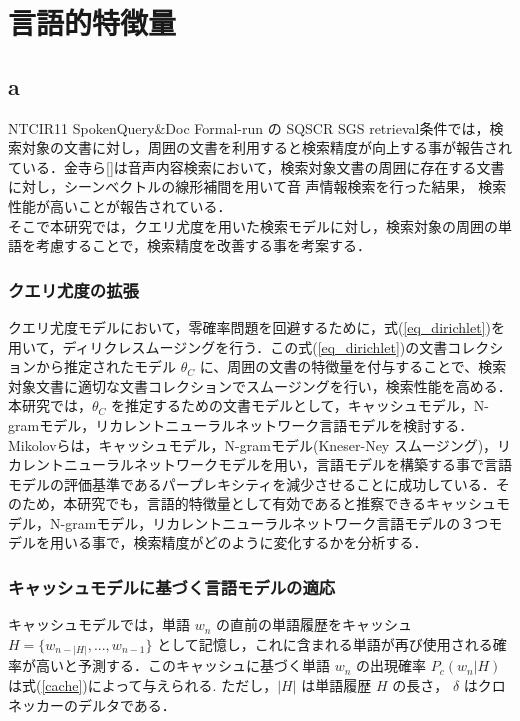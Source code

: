 \chapter{言語的特徴量}

\section{a}


NTCIR11 SpokenQuery\&Doc Formal-run の SQSCR SGS retrieval条件では，検索対象の文書に対し，周囲の文書を利用すると検索精度が向上する事が報告されている．金寺ら[]は音声内容検索において，検索対象文書の周囲に存在する文書に対し，シーンべクトルの線形補間を用いて音
声情報検索を行った結果，
検索性能が高いことが報告されている． \\
そこで本研究では，クエリ尤度を用いた検索モデルに対し，検索対象の周囲の単語を考慮することで，検索精度を改善する事を考案する．

\subsection{クエリ尤度の拡張}

クエリ尤度モデルにおいて，零確率問題を回避するために，式(\ref{eq_dirichlet})を用いて，ディリクレスムージングを行う．この式(\ref{eq_dirichlet})の文書コレクションから推定されたモデル $\theta_C$ に、周囲の文書の特徴量を付与することで、検索対象文書に適切な文書コレクションでスムージングを行い，検索性能を高める． \\
本研究では，$\theta_C$ を推定するための文書モデルとして，キャッシュモデル，N-gramモデル，リカレントニューラルネットワーク言語モデルを検討する．Mikolovらは，キャッシュモデル，N-gramモデル(Kneser-Ney スムージング)，リカレントニューラルネットワークモデルを用い，言語モデルを構築する事で言語モデルの評価基準であるパープレキシティを減少させることに成功している．そのため，本研究でも，言語的特徴量として有効であると推察できるキャッシュモデル，N-gramモデル，リカレントニューラルネットワーク言語モデルの３つモデルを用いる事で，検索精度がどのように変化するかを分析する．

\subsection{キャッシュモデルに基づく言語モデルの適応}
キャッシュモデルでは，単語 $w_n$ の直前の単語履歴をキャッシュ $H = \{ w_{n-|H|}, ..., w_{n-1}\} $ として記憶し，これに含まれる単語が再び使用される確率が高いと予測する．このキャッシュに基づく単語 $w_n$ の出現確率 $P_c(w_n|H)$ は式(\ref{cache})によって与えられる. ただし，$|H|$ は単語履歴 $H$ の長さ， $\delta$ はクロネッカーのデルタである．

